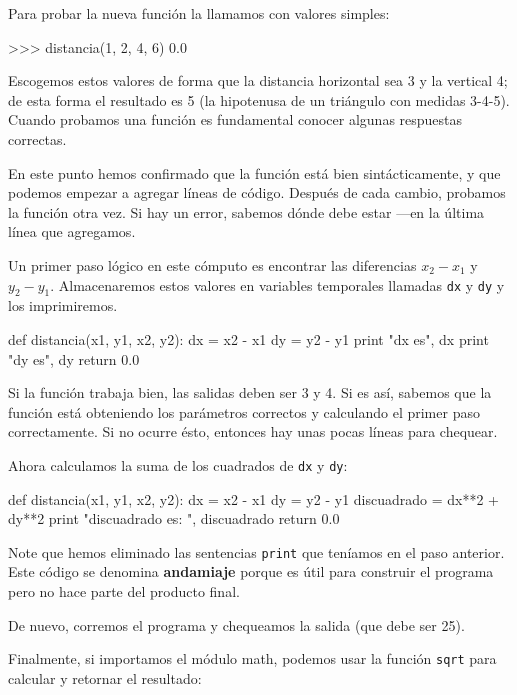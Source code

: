 Para probar la nueva función la llamamos con valores simples:

\beforeverb
\begin{pyconcode}
>>> distancia(1, 2, 4, 6)
0.0
\end{pyconcode}
\afterverb
%

Escogemos estos valores de forma que la distancia horizontal sea 3
y la vertical 4; de esta forma el resultado es 5 (la hipotenusa
de un triángulo con medidas 3-4-5). Cuando probamos una función
es fundamental conocer algunas respuestas correctas.

En este punto hemos confirmado que la función está bien sintácticamente,
y que podemos empezar a agregar líneas de código. Después de cada
cambio, probamos la función otra vez. Si hay un error, sabemos
dónde debe estar ---en la última línea que agregamos.

Un primer paso lógico en este cómputo es encontrar las diferencias
$x_2 - x_1$ y $y_2 - y_1$.  Almacenaremos estos valores en
variables temporales llamadas \texttt{dx} y \texttt{dy} y los imprimiremos.

\beforeverb
\begin{pythoncode}
def distancia(x1, y1, x2, y2):
  dx = x2 - x1
  dy = y2 - y1
  print "dx es", dx
  print "dy es", dy
  return 0.0
\end{pythoncode}
\afterverb
%

Si la función trabaja bien, las salidas deben ser 3 y 4. Si es así,
sabemos que la función está obteniendo los parámetros correctos y
calculando el primer paso correctamente. Si no ocurre ésto, entonces
hay unas pocas líneas para chequear.

Ahora calculamos la suma de los cuadrados de \texttt{dx} y \texttt{dy}:

\beforeverb
\begin{pythoncode}
def distancia(x1, y1, x2, y2):
  dx = x2 - x1
  dy = y2 - y1
  discuadrado = dx**2 + dy**2
  print "discuadrado es: ", discuadrado
  return 0.0
\end{pythoncode}
\afterverb
%

Note que hemos eliminado las sentencias \texttt{print} que teníamos en el paso
anterior. Este código se denomina {\bf andamiaje} porque es útil para
construir el programa pero no hace parte del producto final.

De nuevo, corremos el programa y chequeamos la salida (que debe ser 25).

Finalmente, si importamos el módulo math, podemos usar la función
\texttt{sqrt} para calcular y retornar el resultado:

